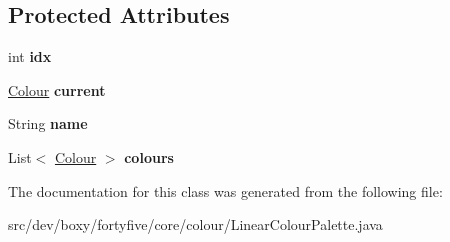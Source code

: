 \subsection*{Protected Attributes}
\begin{DoxyCompactItemize}
\item 
\hypertarget{classdev_1_1boxy_1_1fortyfive_1_1core_1_1colour_1_1_linear_colour_palette_a63f81f46bc1fd90b55db91f83fb564d2}{
int {\bfseries idx}}
\label{df/dda/classdev_1_1boxy_1_1fortyfive_1_1core_1_1colour_1_1_linear_colour_palette_a63f81f46bc1fd90b55db91f83fb564d2}

\item 
\hypertarget{classdev_1_1boxy_1_1fortyfive_1_1core_1_1colour_1_1_linear_colour_palette_a498f8f2a5b8d5f5a427d04f0814582a4}{
\hyperlink{classdev_1_1boxy_1_1fortyfive_1_1core_1_1colour_1_1_colour}{Colour} {\bfseries current}}
\label{df/dda/classdev_1_1boxy_1_1fortyfive_1_1core_1_1colour_1_1_linear_colour_palette_a498f8f2a5b8d5f5a427d04f0814582a4}

\item 
\hypertarget{classdev_1_1boxy_1_1fortyfive_1_1core_1_1colour_1_1_linear_colour_palette_a0eb8c9d3144b43c771c1dbc28d3b537a}{
String {\bfseries name}}
\label{df/dda/classdev_1_1boxy_1_1fortyfive_1_1core_1_1colour_1_1_linear_colour_palette_a0eb8c9d3144b43c771c1dbc28d3b537a}

\item 
\hypertarget{classdev_1_1boxy_1_1fortyfive_1_1core_1_1colour_1_1_linear_colour_palette_afbea4a5e67765f3a552c3979f6bd9dcd}{
List$<$ \hyperlink{classdev_1_1boxy_1_1fortyfive_1_1core_1_1colour_1_1_colour}{Colour} $>$ {\bfseries colours}}
\label{df/dda/classdev_1_1boxy_1_1fortyfive_1_1core_1_1colour_1_1_linear_colour_palette_afbea4a5e67765f3a552c3979f6bd9dcd}

\end{DoxyCompactItemize}


The documentation for this class was generated from the following file:\begin{DoxyCompactItemize}
\item 
src/dev/boxy/fortyfive/core/colour/LinearColourPalette.java\end{DoxyCompactItemize}
